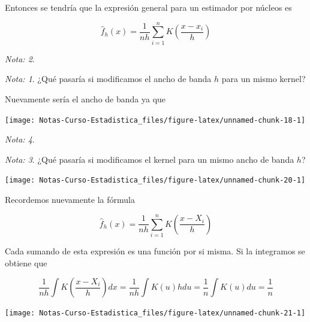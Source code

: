 \documentclass[
  12pt,
]{book}
\theoremstyle{definition}
\theoremstyle{definition}
\theoremstyle{definition}
\theoremstyle{remark}
\newtheorem*{remark}{Nota: }
\begin{document}
Entonces se tendría que la expresión general para un estimador por núcleos es

\begin{equation*}
\hat{f}_{h}\left( x \right) = \frac{1}{nh}\sum_{i=1}^{n} K\left( \frac{x-x_{i}}{h} \right)
\end{equation*}

\begin{remark}
\begin{remark}

{}¿Qué pasaría si modificamos el ancho de banda \(h\) para un mismo kernel?

\end{remark}
\end{remark}

Nuevamente sería el ancho de banda ya que

\begin{center}\texttt{[image: Notas-Curso-Estadistica\_files/figure-latex/unnamed-chunk-18-1]} \end{center}

\begin{remark}
\begin{remark}

{}¿Qué pasaría si modificamos el kernel para un mismo ancho de banda \(h\)?

\end{remark}
\end{remark}

\begin{center}\texttt{[image: Notas-Curso-Estadistica\_files/figure-latex/unnamed-chunk-20-1]} \end{center}

Recordemos nuevamente la fórmula

\begin{equation*}
\hat{f}_{h}\left( x \right) = \frac{1}{nh}\sum_{i=1}^{n} K\left( \frac{x-X_{i}}{h} \right)
\end{equation*}

Cada sumando de esta expresión es una función por si misma. Si la integramos se obtiene que

\begin{equation*}
\frac{1}{nh}\int K\left( \frac{x-X_{i}}{h} \right) dx
= \frac{1}{nh} \int K\left( u \right) h du
= \frac{1}{n} \int K(u) du
= \frac{1}{n}
\end{equation*}

\begin{center}\texttt{[image: Notas-Curso-Estadistica\_files/figure-latex/unnamed-chunk-21-1]} \end{center}
\end{document}
